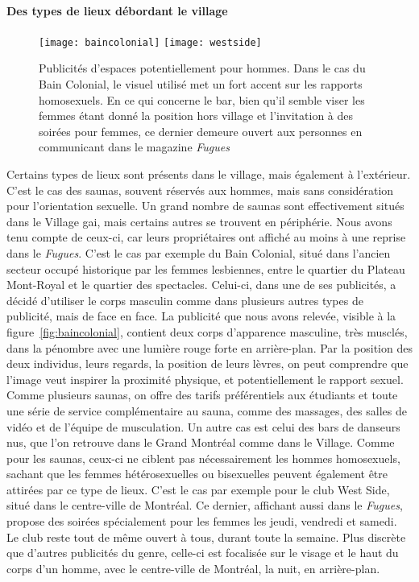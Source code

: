 \paragraph{Des types de lieux débordant le village}
\begin{figure}[ht]
 \centering
 {\texttt{[image: baincolonial]}}
 {\texttt{[image: westside]}}
 \caption[Publicités d'espaces hors village]{Publicités d'espaces potentiellement pour hommes. Dans le cas du Bain Colonial, le visuel utilisé met un fort accent sur les rapports homosexuels. En ce qui concerne le bar, bien qu'il semble viser les femmes étant donné la position hors village et l'invitation à des soirées pour femmes, ce dernier demeure ouvert aux personnes \lgbt{} en communicant dans le magazine \emph{Fugues}}\label{figs:horsvillage}
\end{figure}
Certains types de lieux sont présents dans le village, mais également à l'extérieur.
C'est le cas des saunas, souvent réservés aux hommes, mais sans considération pour l'orientation sexuelle.
Un grand nombre de saunas sont effectivement situés dans le Village gai, mais certains autres se trouvent en périphérie.
Nous avons tenu compte de ceux-ci, car leurs propriétaires ont affiché au moins à une reprise dans le \emph{Fugues}.
C'est le cas par exemple du Bain Colonial, situé dans l'ancien secteur occupé historique par les femmes lesbiennes, entre le quartier du Plateau Mont-Royal et le quartier des spectacles.
Celui-ci, dans une de ses publicités, a décidé d'utiliser le corps masculin comme dans plusieurs autres types de publicité, mais de face en face.
La publicité que nous avons relevée, visible à la figure~\ref{fig:baincolonial}, contient deux corps d'apparence masculine, très musclés, dans la pénombre avec une lumière rouge forte en arrière-plan.
Par la position des deux individus, leurs regards, la position de leurs lèvres, on peut comprendre que l'image veut inspirer la proximité physique, et potentiellement le rapport sexuel.
Comme plusieurs saunas, on offre des tarifs préférentiels aux étudiants et toute une série de service complémentaire au sauna, comme des massages, des salles de vidéo et de l'équipe de musculation.
Un autre cas est celui des bars de danseurs nus, que l'on retrouve dans le Grand Montréal comme dans le Village.
Comme pour les saunas, ceux-ci ne ciblent pas nécessairement les hommes homosexuels, sachant que les femmes hétérosexuelles ou bisexuelles peuvent également être attirées par ce type de lieux.
C'est le cas par exemple pour le club West Side, situé dans le centre-ville de Montréal.
Ce dernier, affichant aussi dans le \emph{Fugues}, propose des soirées spécialement pour les femmes les jeudi, vendredi et samedi.
Le club reste tout de même ouvert à tous, durant toute la semaine.
Plus discrète que d'autres publicités du genre, celle-ci est focalisée sur le visage et le haut du corps d'un homme, avec le centre-ville de Montréal, la nuit, en arrière-plan.

